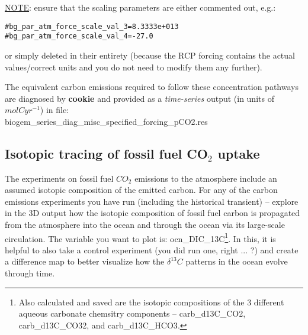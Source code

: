\vspace{1mm}

\noindent \uline{NOTE}: ensure that
the scaling parameters are either commented out, e.g.:
\vspace{-2pt}\small\begin{verbatim}
#bg_par_atm_force_scale_val_3=8.3333e+013
#bg_par_atm_force_scale_val_4=-27.0
\end{verbatim}\normalsize\vspace{-2pt}
\noindent or simply deleted in their entirety (because the RCP forcing contains the actual values/correct units and you do not need to modify them any further).

\vspace{1mm}

The equivalent carbon emissions required to follow these concentration pathways are diagnosed by \textbf{cookie} and provided as a \textit{time-series} output (in units of \(mol C yr^{-1}\)) in file: 
\vspace{1mm}
\\\textsf{\footnotesize biogem\_series\_diag\_misc\_specified\_forcing\_pCO2.res}

\newpage

\subsection{Isotopic tracing of fossil fuel CO$_{2}$ uptake}

\noindent The  experiments on fossil fuel \(CO_{2}\) emissions to the atmosphere include an assumed isotopic composition of the emitted carbon. For any of the carbon emissions experiments you have run (including the historical transient) -- explore in the 3D output how the  isotopic composition of fossil fuel carbon is propagated from the atmosphere into the ocean and  through the ocean via its large-scale circulation. The variable you want to plot is: \textsf{\footnotesize ocn\_DIC\_13C}\footnote{Also calculated and saved are the isotopic compositions of the 3 different aqueous carbonate chemsitry components -- \textsf{\footnotesize carb\_d13C\_CO2}, \textsf{\footnotesize carb\_d13C\_CO32}, and \textsf{\footnotesize carb\_d13C\_HCO3}.}. In this, it is helpful to also take a control experiment (you did run one, right ... ?) and create a difference map to better visualize how the \(\delta^{13}C\) patterns in the ocean evolve through time.

